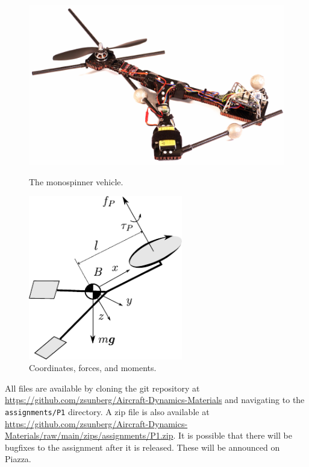 \documentclass{article}
\theoremstyle{definition}
\begin{document}
\begin{figure}[h]
\centering
\begin{minipage}{0.9\textwidth}
\begin{minipage}{0.5\textwidth}
        \centering
        \includegraphics[width=\textwidth]{monospinner.pdf}
        \caption{The monospinner vehicle.}
\end{minipage}
\begin{minipage}{0.5\textwidth}
        \centering
        \includegraphics[width=0.6\textwidth]{monospinner-coordinates.pdf}
        \caption{Coordinates, forces, and moments.}
\end{minipage}
\end{minipage}
\end{figure}

All files are available by cloning the git repository at \url{https://github.com/zsunberg/Aircraft-Dynamics-Materials} and navigating to the \texttt{assignments/P1} directory. A zip file is also available at \url{https://github.com/zsunberg/Aircraft-Dynamics-Materials/raw/main/zips/assignments/P1.zip}. It is possible that there will be bugfixes to the assignment after it is released. These will be announced on Piazza.
\end{document}
